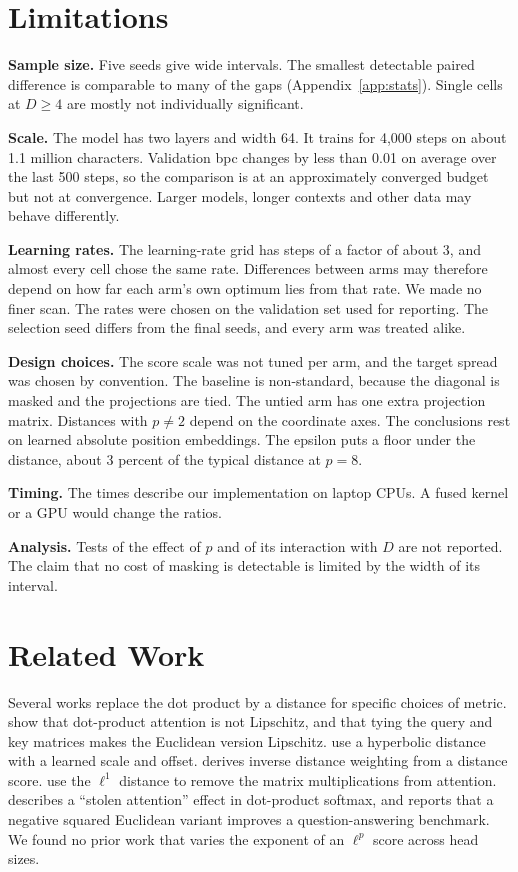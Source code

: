 \documentclass[11pt]{article}
\begin{document}
\section{Limitations}\label{sec:limits}

\textbf{Sample size.}
Five seeds give wide intervals.
The smallest detectable paired difference is comparable to many of the gaps (Appendix~\ref{app:stats}).
Single cells at $D\ge4$ are mostly not individually significant.

\textbf{Scale.}
The model has two layers and width 64.
It trains for 4,000 steps on about 1.1 million characters.
Validation bpc changes by less than 0.01 on average over the last 500 steps, so the comparison is at an approximately converged budget but not at convergence.
Larger models, longer contexts and other data may behave differently.

\textbf{Learning rates.}
The learning-rate grid has steps of a factor of about 3, and almost every cell chose the same rate.
Differences between arms may therefore depend on how far each arm's own optimum lies from that rate.
We made no finer scan.
The rates were chosen on the validation set used for reporting.
The selection seed differs from the final seeds, and every arm was treated alike.

\textbf{Design choices.}
The score scale was not tuned per arm, and the target spread was chosen by convention.
The baseline is non-standard, because the diagonal is masked and the projections are tied.
The untied arm has one extra projection matrix.
Distances with $p\ne2$ depend on the coordinate axes.
The conclusions rest on learned absolute position embeddings.
The epsilon puts a floor under the distance, about 3 percent of the typical distance at $p=8$.

\textbf{Timing.}
The times describe our implementation on laptop CPUs.
A fused kernel or a GPU would change the ratios.

\textbf{Analysis.}
Tests of the effect of $p$ and of its interaction with $D$ are not reported.
The claim that no cost of masking is detectable is limited by the width of its interval.

\section{Related Work}\label{sec:related}

Several works replace the dot product by a distance for specific choices of metric.
\citet{kim2021lipschitz} show that dot-product attention is not Lipschitz, and that tying the query and key matrices makes the Euclidean version Lipschitz.
\citet{gulcehre2019hyperbolic} use a hyperbolic distance with a learned scale and offset.
\citet{mccarter2023inverse} derives inverse distance weighting from a distance score.
\citet{gao2025eco} use the $\ell^1$ distance to remove the matrix multiplications from attention.
\citet{williams2024stolen} describes a ``stolen attention'' effect in dot-product softmax, and reports that a negative squared Euclidean variant improves a question-answering benchmark.
We found no prior work that varies the exponent of an $\ell^p$ score across head sizes.
\end{document}
